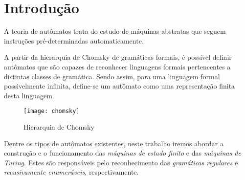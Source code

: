 \section{Introdução}

A teoria de autômatos trata do estudo de máquinas abstratas que seguem
instruções pré-determinadas automaticamente.

A partir da hierarquia de Chomsky de gramáticas formais, é possível definir
autômatos que são capazes de reconhecer linguagens formais pertencentes a
distintas classes de gramática. Sendo assim, para uma linguagem formal
possivelmente infinita, define-se um autômato como uma representação finita
desta linguagem.

\begin{figure}[H]
    \centering
    \texttt{[image: chomsky]}
    \label{chomsky}
    \caption{Hierarquia de Chomsky}
\end{figure}

Dentre os tipos de autômatos existentes, neste trabalho iremos abordar a
construção e o funcionamento das \emph{máquinas de estado finito} e das
\emph{máquinas de Turing}. Estes são responsáveis pelo reconhecimento das
\emph{gramáticas regulares } e \emph{recusivamente enumeráveis},
respectivamente.
